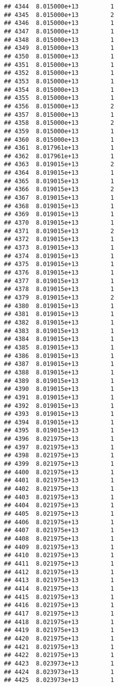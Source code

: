 \documentclass[
]{article}
\begin{document}
\begin{verbatim}
## 4344  8.015000e+13         1
## 4345  8.015000e+13         2
## 4346  8.015000e+13         1
## 4347  8.015000e+13         1
## 4348  8.015000e+13         1
## 4349  8.015000e+13         1
## 4350  8.015000e+13         1
## 4351  8.015000e+13         1
## 4352  8.015000e+13         1
## 4353  8.015000e+13         1
## 4354  8.015000e+13         1
## 4355  8.015000e+13         1
## 4356  8.015000e+13         2
## 4357  8.015000e+13         1
## 4358  8.015000e+13         2
## 4359  8.015000e+13         1
## 4360  8.015000e+13         1
## 4361  8.017961e+13         1
## 4362  8.017961e+13         1
## 4363  8.019015e+13         2
## 4364  8.019015e+13         1
## 4365  8.019015e+13         1
## 4366  8.019015e+13         2
## 4367  8.019015e+13         1
## 4368  8.019015e+13         1
## 4369  8.019015e+13         1
## 4370  8.019015e+13         1
## 4371  8.019015e+13         2
## 4372  8.019015e+13         1
## 4373  8.019015e+13         1
## 4374  8.019015e+13         1
## 4375  8.019015e+13         1
## 4376  8.019015e+13         1
## 4377  8.019015e+13         1
## 4378  8.019015e+13         1
## 4379  8.019015e+13         2
## 4380  8.019015e+13         1
## 4381  8.019015e+13         1
## 4382  8.019015e+13         1
## 4383  8.019015e+13         1
## 4384  8.019015e+13         1
## 4385  8.019015e+13         1
## 4386  8.019015e+13         1
## 4387  8.019015e+13         1
## 4388  8.019015e+13         1
## 4389  8.019015e+13         1
## 4390  8.019015e+13         1
## 4391  8.019015e+13         1
## 4392  8.019015e+13         1
## 4393  8.019015e+13         1
## 4394  8.019015e+13         1
## 4395  8.019015e+13         1
## 4396  8.021975e+13         1
## 4397  8.021975e+13         1
## 4398  8.021975e+13         1
## 4399  8.021975e+13         1
## 4400  8.021975e+13         1
## 4401  8.021975e+13         1
## 4402  8.021975e+13         1
## 4403  8.021975e+13         1
## 4404  8.021975e+13         1
## 4405  8.021975e+13         1
## 4406  8.021975e+13         1
## 4407  8.021975e+13         1
## 4408  8.021975e+13         1
## 4409  8.021975e+13         1
## 4410  8.021975e+13         1
## 4411  8.021975e+13         1
## 4412  8.021975e+13         1
## 4413  8.021975e+13         1
## 4414  8.021975e+13         1
## 4415  8.021975e+13         1
## 4416  8.021975e+13         1
## 4417  8.021975e+13         1
## 4418  8.021975e+13         1
## 4419  8.021975e+13         1
## 4420  8.021975e+13         1
## 4421  8.021975e+13         1
## 4422  8.021975e+13         1
## 4423  8.023973e+13         1
## 4424  8.023973e+13         1
## 4425  8.023973e+13         1

\end{verbatim}
\end{document}
